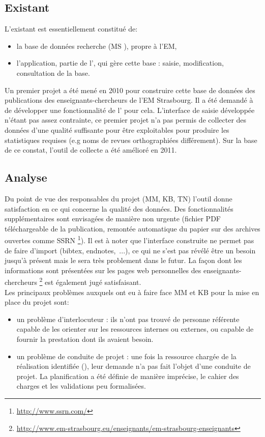 \documentclass{book}
\begin{document}
\subsection{Existant}

L'existant est essentiellement constitué de:
\begin{itemize}
\item la base de données recherche (MS ), propre à l'EM,
\item l'application, partie de l', qui gère cette base : 
saisie, modification, consultation de la base.
\end{itemize}
Un premier projet a  été mené en 2010 pour construire cette  base de données des
publications des enseignants-chercheurs  de l'EM Strasbourg. Il a  été demandé à
\CK   de    développer   une   fonctionnalité   de    l'   pour
cela. L'interface de saisie développée  n'étant pas assez contrainte, ce premier
projet n'a  pas permis de  collecter des  données d'une qualité  suffisante pour
être exploitables  pour produire les  statistiques requises (e.g noms  de revues
orthographiées différement).  Sur la base de  ce constat, l'outil de  collecte a
été amélioré en 2011.

\subsection{Analyse}

Du  point  de  vue  des  responsables  du projet  (MM,  KB,  TN)  l'outil  donne
satisfaction  en ce  qui concerne  la qualité  des données.  Des fonctionnalités
supplémentaires   sont  envisagées   de   manière  non   urgente  (fichier   PDF
téléchargeable  de  la  publication,  remontée automatique  du  papier  sur  des
archives ouvertes comme SSRN%
\footnote{\url{  http://www.ssrn.com/}}).   Il  est   à  noter  que  l'interface
construite ne  permet pas de faire  d'import (bibtex, endnotes,~...), ce  qui ne
s'est pas  révélé être un  besoin jusqu'à présent  mais le sera  très problement
dans le futur.  La façon dont les informations sont présentées sur les pages web
personnelles des enseignants-chercheurs%
\footnote{\url{http://www.em-strasbourg.eu/enseignants/em-strasbourg-enseignants}}
est également jugé satisfaisant.\\

Les principaux problèmes auxquels ont eu à faire face MM et KB pour la mise 
en place du projet sont:
\begin{itemize}
\item un problème d'interlocuteur : ils n'ont pas trouvé de personne référente
capable de les orienter sur les ressources internes ou externes, ou capable de 
fournir la prestation dont ils avaient besoin.
\item un problème  de conduite de projet  : une fois la ressource  chargée de la
  réalisation identifiée (\CK), leur demande n'a pas fait l'objet d'une conduite
  de projet. La planification a été  définie de manière imprécise, le cahier des
  charges et les validations peu formalisées.
\end{itemize}
\end{document}

